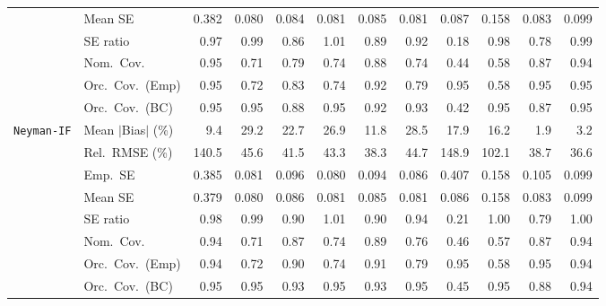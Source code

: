 \begin{landscape}
\begin{longtable}{llrrrrrrrrrr}
 & Mean SE & 0.382 & 0.080 & 0.084 & 0.081 & 0.085 & 0.081 & 0.087 & 0.158 & 0.083 & 0.099 \\
 & SE ratio & \cellcolor{rankthree}0.97 & \cellcolor{rankone}0.99 & 0.86 & \cellcolor{rankone}1.01 & 0.89 & 0.92 & 0.18 & \cellcolor{ranktwo}0.98 & 0.78 & \cellcolor{rankone}0.99 \\
 & Nom.\ Cov. & \cellcolor{rankone}0.95 & 0.71 & 0.79 & 0.74 & \cellcolor{rankthree}0.88 & 0.74 & 0.44 & 0.58 & 0.87 & \cellcolor{ranktwo}0.94 \\
 & Orc.\ Cov.\ (Emp) & \cellcolor{rankone}0.95 & 0.72 & \cellcolor{rankthree}0.83 & 0.74 & \cellcolor{ranktwo}0.92 & 0.79 & \cellcolor{rankone}0.95 & 0.58 & \cellcolor{rankone}0.95 & \cellcolor{rankone}0.95 \\
 & Orc.\ Cov.\ (BC) & \cellcolor{rankone}0.95 & \cellcolor{rankone}0.95 & 0.88 & \cellcolor{rankone}0.95 & \cellcolor{rankthree}0.92 & \cellcolor{ranktwo}0.93 & 0.42 & \cellcolor{rankone}0.95 & 0.87 & \cellcolor{rankone}0.95 \\
\addlinespace[2pt]
\quad \texttt{Neyman-IF} & Mean $|$Bias$|$ (\%) & \cellcolor{rankthree}9.4 & 29.2 & 22.7 & 26.9 & 11.8 & 28.5 & 17.9 & 16.2 & \cellcolor{rankone}1.9 & \cellcolor{ranktwo}3.2 \\
 & Rel.\ RMSE (\%) & 140.5 & 45.6 & 41.5 & 43.3 & \cellcolor{ranktwo}38.3 & 44.7 & 148.9 & 102.1 & \cellcolor{rankthree}38.7 & \cellcolor{rankone}36.6 \\
 & Emp.\ SE & 0.385 & 0.081 & 0.096 & 0.080 & 0.094 & 0.086 & 0.407 & 0.158 & 0.105 & 0.099 \\
 & Mean SE & 0.379 & 0.080 & 0.086 & 0.081 & 0.085 & 0.081 & 0.086 & 0.158 & 0.083 & 0.099 \\
 & SE ratio & \cellcolor{rankthree}0.98 & \cellcolor{ranktwo}0.99 & 0.90 & \cellcolor{ranktwo}1.01 & 0.90 & 0.94 & 0.21 & \cellcolor{rankone}1.00 & 0.79 & \cellcolor{rankone}1.00 \\
 & Nom.\ Cov. & \cellcolor{rankone}0.94 & 0.71 & \cellcolor{rankthree}0.87 & 0.74 & \cellcolor{ranktwo}0.89 & 0.76 & 0.46 & 0.57 & \cellcolor{rankthree}0.87 & \cellcolor{rankone}0.94 \\
 & Orc.\ Cov.\ (Emp) & \cellcolor{ranktwo}0.94 & 0.72 & 0.90 & 0.74 & \cellcolor{rankthree}0.91 & 0.79 & \cellcolor{rankone}0.95 & 0.58 & \cellcolor{rankone}0.95 & \cellcolor{ranktwo}0.94 \\
 & Orc.\ Cov.\ (BC) & \cellcolor{rankone}0.95 & \cellcolor{rankone}0.95 & \cellcolor{rankthree}0.93 & \cellcolor{rankone}0.95 & \cellcolor{rankthree}0.93 & \cellcolor{rankone}0.95 & 0.45 & \cellcolor{rankone}0.95 & 0.88 & \cellcolor{ranktwo}0.94 \\

\end{longtable}
\end{landscape}
